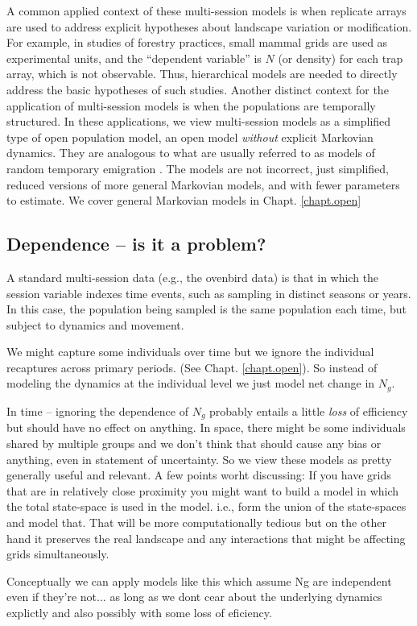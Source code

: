 A common applied context of these multi-session models is when
replicate arrays are used to address explicit hypotheses about
landscape variation or modification. For example, in studies of
forestry practices, small mammal grids are used as experimental units,
and the ``dependent variable'' is $N$ (or density) for each trap
array, which is not observable.  Thus, hierarchical models are needed
to directly address the basic hypotheses of such studies.  Another
distinct context for the application of multi-session models is when
the populations are temporally structured. In these applications, we
view multi-session models as a simplified type of open population
model, an open model {\it without} explicit Markovian dynamics. They
are analogous to what are usually referred to as models of random
temporary emigration \citep{kendall_etal:1997, chandler_etal:2011}.
The models are not incorrect, just simplified, reduced versions of
more general Markovian models, and with fewer parameters to estimate.
We cover general Markovian models in Chapt. \ref{chapt.open}








\subsection{Dependence -- is it a problem?}

A standard multi-session data (e.g., the ovenbird data) is that in
which the session variable indexes time events, such as sampling in
distinct seasons or years. 
In this case, the population being sampled is the same population each
time, but subject to dynamics and movement. 

We might capture some individuals over time but we ignore the
individual recaptures across primary periods. (See Chapt. 
\ref{chapt.open}). So instead of modeling the dynamics at the individual
level we just model net change in $N_{g}$.

In time -- ignoring the dependence of $N_{g}$ probably entails a
little {\it loss} of efficiency but should have no effect on anything.
In space, there might be some individuals shared by multiple groups
and we don't think that should cause any bias or anything, even in
statement of uncertainty. So we view these models as pretty generally
useful and relevant.
A few points worht discussing: If you have grids that are in
relatively close proximity you might want to build a model in which
the total state-space is used in the model. i.e., form the union of
the state-spaces and model that. That will be more computationally
tedious but on the other hand it preserves the real landscape and any
interactions that might be affecting grids simultaneously. 

Conceptually we can apply models like this which assume Ng are
independent even if they're not... as long as we dont cear about the
underlying dynamics explictly and also possibly with some loss of
eficiency. 







